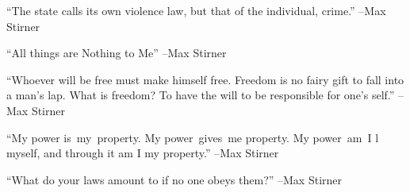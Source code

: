 \documentclass{article}%
\begin{document}
\linebreak%
\vspace{1mm}%
\begin{minipage}{\textwidth}%
\flushleft%
“The state calls its own violence law, but that of the individual, crime.”%
\linebreak%
\vspace{1mm}%
–Max Stirner%
\linebreak%
\vspace{1mm}%
\end{minipage}%
\linebreak%
\vspace{1mm}%
\begin{minipage}{\textwidth}%
\flushleft%
“All things are Nothing to Me”%
\linebreak%
\vspace{1mm}%
–Max Stirner%
\linebreak%
\vspace{1mm}%
\end{minipage}%
\linebreak%
\vspace{1mm}%
\begin{minipage}{\textwidth}%
\flushleft%
“Whoever will be free must make himself free. Freedom is no fairy gift to fall into a man's lap. What is freedom? To have the will to be responsible for one's self.”%
\linebreak%
\vspace{1mm}%
–Max Stirner%
\linebreak%
\vspace{1mm}%
\end{minipage}%
\linebreak%
\vspace{1mm}%
\begin{minipage}{\textwidth}%
\flushleft%
“My power is~my~property. My power~gives~me property. My power~am~I l myself, and through it am I my property.”%
\linebreak%
\vspace{1mm}%
–Max Stirner%
\linebreak%
\vspace{1mm}%
\end{minipage}%
\linebreak%
\vspace{1mm}%
\begin{minipage}{\textwidth}%
\flushleft%
“What do your laws amount to if no one obeys them?”%
\linebreak%
\vspace{1mm}%
–Max Stirner%
\linebreak%
\vspace{1mm}%
\end{minipage}%
\end{document}
